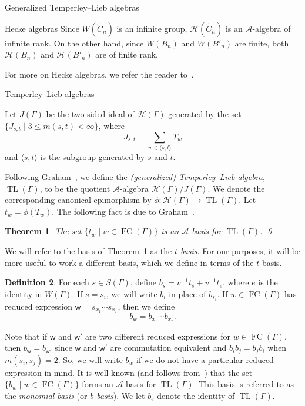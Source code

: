 \documentclass[11pt]{amsart}
\newtheorem{theorem}{Theorem}[subsection]
\theoremstyle{definition}
\newtheorem{definition}[theorem]{Definition}
\numberwithin{equation}{section}
\newcommand{\A}{\mathcal{A}}
\newcommand{\C}{\widetilde{C}}
\DeclareMathOperator{\TL}{TL}
\renewcommand{\(}{\left(}
\renewcommand{\)}{\right)}
\newcommand{\w}{\mathsf{w}}
\renewcommand{\H}{\mathcal{H}}
\DeclareMathOperator{\FC}{FC}
\begin{document}
\begin{section}{Generalized Temperley--Lieb algebras}
\begin{subsection}{Hecke algebras}
Since $W(\C_{n})$ is an infinite group, $\H(\C_{n})$ is an $\A$-algebra of infinite rank.  On the other hand, since $W(B_{n})$ and $W(B'_{n})$ are finite, both $\H(B_{n})$ and $\H(B'_{n})$ are of finite rank.

For more on Hecke algebras, we refer the reader to~\cite[Chapter 7]{Humphreys1990}.

\end{subsection}


\begin{subsection}{Temperley--Lieb algebras}\label{subsec:TL-algebras}

Let $J(\Gamma)$ be the two-sided ideal of $\H(\Gamma)$ generated by the set $\{J_{s,t}\mid 3\leq m(s,t)<\infty\}$, where
\[
J_{s,t}=\sum_{w \in \langle s, t \rangle}T_{w}
\]
and $\langle s, t \rangle$ is the subgroup generated by $s$ and $t$.

Following Graham~\cite[Definition 6.1]{Graham1995}, we define the \emph{(generalized) Temperley--Lieb algebra}, $\TL(\Gamma)$, to be the quotient $\A$-algebra $\H(\Gamma)/J(\Gamma)$.  We denote the corresponding canonical epimorphism by $\phi: \H(\Gamma) \to \TL(\Gamma)$.  Let $t_{w}=\phi(T_{w})$.  The following fact is due to Graham~\cite[Theorem 6.2]{Graham1995}.

\begin{theorem}\label{t-basis}
The set $\{t_{w}\mid w \in \FC(\Gamma)\}$ is an $\A$-basis for $\TL(\Gamma)$. \qed
\end{theorem}

We will refer to the basis of Theorem~\ref{t-basis} as the \emph{$t$-basis}.  For our purposes, it will be more useful to work a different basis, which we define in terms of the $t$-basis.

\begin{definition}
For each $s \in S(\Gamma)$, define $b_{s}=v^{-1}t_{s}+v^{-1}t_{e}$, where $e$ is the identity in $W(\Gamma)$.  If $s=s_{i}$, we will write $b_{i}$ in place of $b_{s_{i}}$.  If $w \in \FC(\Gamma)$ has reduced expression $\w=s_{x_{1}}\cdots s_{x_{r}}$, then we define 
\[
b_{\w}=b_{x_{1}}\cdots b_{x_{r}}.
\]
\end{definition}

Note that if $\w$ and $\w'$ are two different reduced expressions for $w \in \FC(\Gamma)$, then $b_{\w}=b_{\w'}$ since $\w$ and $\w'$ are commutation equivalent and $b_{i}b_{j}=b_{j}b_{i}$ when $m(s_{i}, s_{j})=2$.  So, we will write $b_{w}$ if we do not have a particular reduced expression in mind.  It is well known (and follows from~\cite[Proposition 2.4]{Green2006a}) that the set $\{b_{w}\mid w \in \FC(\Gamma)\}$ forms an $\A$-basis for $\TL(\Gamma)$.  This basis is referred to as the \emph{monomial basis} (or \emph{$b$-basis}).  We let $b_{e}$ denote the identity of $\TL(\Gamma)$.


\end{subsection}
\end{section}
\end{document}
